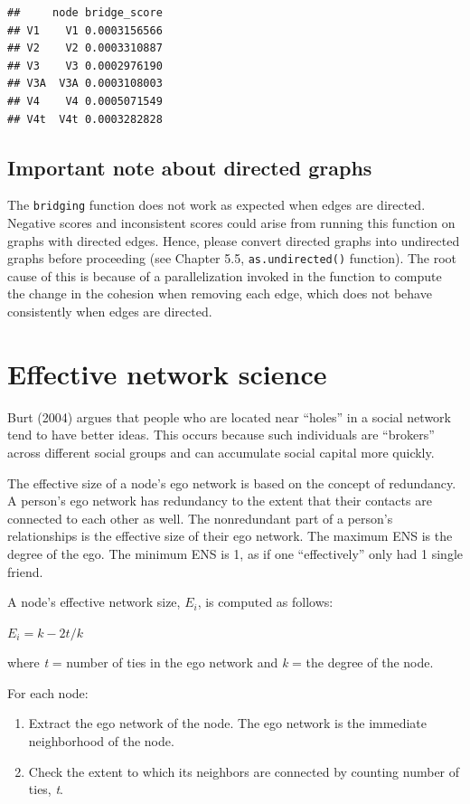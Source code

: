 \documentclass[
]{book}
\providecommand{\tightlist}{%
  \setlength{\itemsep}{0pt}\setlength{\parskip}{0pt}}
\begin{document}
\begin{verbatim}
##     node bridge_score
## V1    V1 0.0003156566
## V2    V2 0.0003310887
## V3    V3 0.0002976190
## V3A  V3A 0.0003108003
## V4    V4 0.0005071549
## V4t  V4t 0.0003282828
\end{verbatim}

\subsection{Important note about directed graphs}\label{important-note-about-directed-graphs}

The \texttt{bridging} function does not work as expected when edges are directed. Negative scores and inconsistent scores could arise from running this function on graphs with directed edges. Hence, please convert directed graphs into undirected graphs before proceeding (see Chapter 5.5, \texttt{as.undirected()} function). The root cause of this is because of a parallelization invoked in the function to compute the change in the cohesion when removing each edge, which does not behave consistently when edges are directed.

\section{Effective network science}\label{effective-network-science}

Burt (2004) argues that people who are located near ``holes'' in a social network tend to have better ideas. This occurs because such individuals are ``brokers'' across different social groups and can accumulate social capital more quickly.

The effective size of a node's ego network is based on the concept of redundancy. A person's ego network has redundancy to the extent that their contacts are connected to each other as well. The nonredundant part of a person's relationships is the effective size of their ego network. The maximum ENS is the degree of the ego. The minimum ENS is 1, as if one ``effectively'' only had 1 single friend.

A node's effective network size, \(E_i\), is computed as follows:

\(E_i=k−2t/k\)

where \emph{t} = number of ties in the ego network and \emph{k} = the degree of the node.

For each node:

\begin{enumerate}
\def\labelenumi{\arabic{enumi}.}
\tightlist
\item
  Extract the ego network of the node. The ego network is the immediate neighborhood of the node.
\item
  Check the extent to which its neighbors are connected by counting number of ties, \emph{t}.
\end{enumerate}
\end{document}
